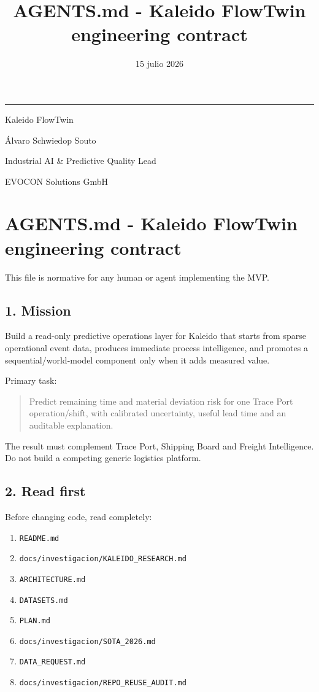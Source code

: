 \documentclass[
  spanish,
  10pt,
  a4paper,
]{article}
\title{AGENTS.md - Kaleido FlowTwin engineering contract}
\author{}
\date{15 julio 2026}
\makeatletter
\providecommand{\tightlist}{%
  \setlength{\itemsep}{0pt}\setlength{\parskip}{0pt}}
\renewcommand{\maketitle}{%
  \hypersetup{pageanchor=false}
  \begin{titlepage}
    \pagecolor{KaleidoNavy}
    \color{white}
    \vspace*{1.4cm}
    {\color{KaleidoCyan}\rule{2.4cm}{2.5pt}\par}
    \vspace{1.1cm}
    {\Huge\bfseries\@title\par}
    \vspace{0.65cm}
    {\Large\color{KaleidoMint}Kaleido FlowTwin\par}
    \vfill
    {\large Álvaro Schwiedop Souto\par}
    \vspace{0.15cm}
    {\normalsize\color{KaleidoMint}Industrial AI \& Predictive Quality Lead\par}
    \vspace{0.15cm}
    {\normalsize\color{KaleidoMint}EVOCON Solutions GmbH\par}
    \vspace{0.25cm}
    {\normalsize\color{KaleidoMint}\@date\par}
  \end{titlepage}
  \hypersetup{pageanchor=true}
  \nopagecolor
  \color{black}
}
\makeatother
\begin{document}
\maketitle

{
\setcounter{tocdepth}{3}
\tableofcontents
}
\section{AGENTS.md - Kaleido FlowTwin engineering
contract}\label{agentsmd---kaleido-flowtwin-engineering-contract}

This file is normative for any human or agent implementing the MVP.

\subsection{1. Mission}\label{1-mission}

Build a read-only predictive operations layer for Kaleido that starts
from sparse operational event data, produces immediate process
intelligence, and promotes a sequential/world-model component only when
it adds measured value.

Primary task:

\begin{quote}
Predict remaining time and material deviation risk for one Trace Port
operation/shift, with calibrated uncertainty, useful lead time and an
auditable explanation.
\end{quote}

The result must complement Trace Port, Shipping Board and Freight
Intelligence. Do not build a competing generic logistics platform.

\subsection{2. Read first}\label{2-read-first}

Before changing code, read completely:

\begin{enumerate}
\def\labelenumi{\arabic{enumi}.}
\tightlist
\item
  \texttt{README.md}
\item
  \texttt{docs/investigacion/KALEIDO\_RESEARCH.md}
\item
  \texttt{ARCHITECTURE.md}
\item
  \texttt{DATASETS.md}
\item
  \texttt{PLAN.md}
\item
  \texttt{docs/investigacion/SOTA\_2026.md}
\item
  \texttt{DATA\_REQUEST.md}
\item
  \texttt{docs/investigacion/REPO\_REUSE\_AUDIT.md}
\end{enumerate}
\end{document}
